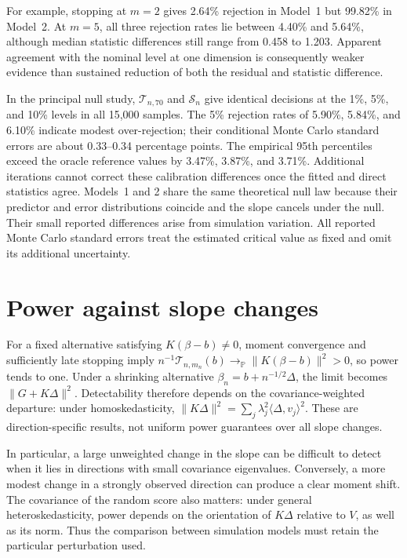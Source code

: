 For example, stopping at $m=2$ gives 2.64\% rejection in Model~1 but
99.82\% in Model~2.  At $m=5$, all three rejection rates lie between
4.40\% and 5.64\%, although median statistic differences still range from
0.458 to 1.203.  Apparent agreement with the nominal level at one dimension
is consequently weaker evidence than sustained reduction of both the
residual and statistic difference.

In the principal null study, $\mathcal T_{n,70}$ and $\mathcal S_n$ give
identical decisions at the 1\%, 5\%, and 10\% levels in all 15,000 samples.
The 5\% rejection rates of 5.90\%, 5.84\%, and 6.10\% indicate modest
over-rejection; their conditional Monte Carlo standard errors are about
0.33--0.34 percentage points.  The empirical 95th percentiles exceed the
oracle reference values by 3.47\%, 3.87\%, and 3.71\%.  Additional
iterations cannot correct these calibration differences once the fitted
and direct statistics agree.  Models~1 and 2 share the same theoretical
null law because their predictor and error distributions coincide and the
slope cancels under the null.  Their small reported differences arise from
simulation variation.  All reported Monte Carlo standard errors treat the
estimated critical value as fixed and omit its additional uncertainty.

\section{Power against slope changes}
\label{main:sec-inference-power}

For a fixed alternative satisfying $K(\beta-b)\neq0$, moment convergence
and sufficiently late stopping imply
$n^{-1}\mathcal T_{n,m_n}(b)\to_{\mathbb P}\|K(\beta-b)\|^2>0$,
so power tends to one.  Under a shrinking alternative
$\beta_n=b+n^{-1/2}\Delta$, the limit becomes $\|G+K\Delta\|^2$.
Detectability therefore depends on the covariance-weighted departure:
under homoskedasticity,
$\|K\Delta\|^2=\sum_j\lambda_j^2\langle\Delta,v_j\rangle^2$.
These are direction-specific results, not uniform power guarantees over
all slope changes.

In particular, a large unweighted change in the slope can be difficult to
detect when it lies in directions with small covariance eigenvalues.
Conversely, a more modest change in a strongly observed direction can
produce a clear moment shift.  The covariance of the random score also
matters: under general heteroskedasticity, power depends on the orientation
of $K\Delta$ relative to $V$, as well as its norm.  Thus the comparison
between simulation models must retain the particular perturbation used.

